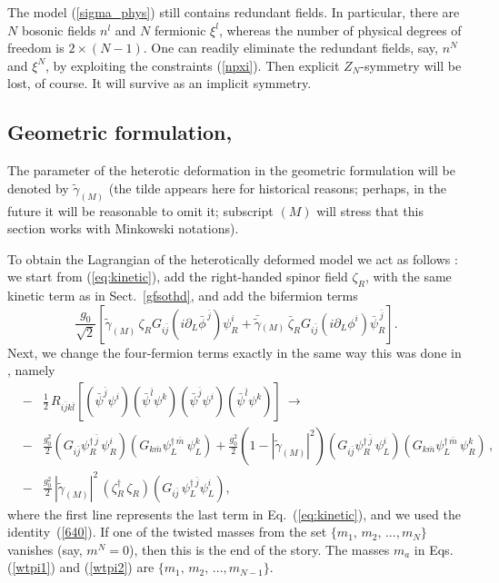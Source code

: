 \documentclass[epsfig,12pt]{article}
\def\beq{\begin{equation}}
\def\eeq{\end{equation}}
\def\beqn{\begin{eqnarray}}
\def\eeqn{\end{eqnarray}}
\newcommand{\pt}{\partial}
\newcommand{\zn}{$Z_N$}
\def\beqn{\begin{eqnarray}}
\def\eeqn{\end{eqnarray}}
\def\beq{\begin{equation}}
\def\eeq{\end{equation}}
\newcommand{\ssm}{{\scriptscriptstyle(M)}}
\begin{document}
	The model (\ref{sigma_phys}) still contains redundant fields.
	In particular, there are $N$ bosonic fields $n^l$ and $N$ fermionic $\xi^l$,
	whereas the number of physical degrees of 
	freedom is $2\times(N-1)$. 
	One can readily eliminate the redundant fields, say, $n^N$ and $\xi^N$,
	by exploiting the constraints (\ref{npxi}). Then explicit \zn-symmetry will be lost, of course.
	It will survive as an implicit symmetry.

\subsection{Geometric formulation, } 
\label{gftgnz}

The parameter of the heterotic deformation in the geometric formulation will be denoted by
$\tilde \gamma_\ssm$ (the tilde appears here for historical reasons;
perhaps, in the future it will be reasonable to omit it;
subscript $\scriptstyle (M)$ will stress that this section works with Minkowski notations).

To obtain the Lagrangian of the heterotically deformed model
we act as follows \cite{BSY3}: we start from (\ref{eq:kinetic}), add the
 right-handed spinor field $\zeta_R$, with the same kinetic term as in Sect.~\ref{gfsothd}, and
 add the bifermion terms
 \beq
 \frac{g_0}{\sqrt 2}
 \left[ \tilde{\gamma}_\ssm\, \zeta_RG_{i\bar j}\left(i\pt_L\bar\phi^{\,\bar j}\right)\psi_R^i + 
        \bar{\tilde \gamma}{}_\ssm\, \bar\zeta_R G_{i\bar j}\left(i\pt_L\phi^{i}
 \right)\bar\psi_R^{\,\bar j} 
 \right].
 \eeq
Next, we change the four-fermion terms exactly in the same way this was done in
 \cite{SY1},
 namely
 \beqn
&-&\frac{1}{2} \,R_{i\bar jk\bar l}\left[\left(\bar\psi^{\bar j}\psi^{i}\right)\left(\bar\psi^{\bar l}\psi^{k}\right)
\left(\bar\psi^{\bar j}\psi^{i}\right)\left(\bar\psi^{\bar l}\psi^{k}\right)
\right]
~\longrightarrow~
\nonumber\\[3mm]
&-& \frac{g_0^2}{2}\left( G_{i\bar j}\psi^{\dagger\, \bar j}_R\, \psi^{ i}_R\right)
\left( G_{k\bar m}\psi^{\dagger\, \bar m}_L\, \psi^{ k}_L\right)+
\frac{g_0^2}{2}\left(1-|\tilde\gamma_\ssm|^2\right)
\left( G_{i\bar j}\psi^{\dagger\, \bar j}_R\, \psi^{ i}_L\right)
\left( G_{k\bar m}\psi^{\dagger\, \bar m}_L\, \psi^{ k}_R\right)\,,
\nonumber
\\[4mm]
&-&
 \frac{g_0^2}{2} \, |\tilde{\gamma}_\ssm |^2 \,\left(\zeta_R^\dagger\, \zeta_R
\right)\left(G_{i\bar j}\,  \psi_L^{\dagger\,\bar j}\psi_L^i\right),
\eeqn
 where the first line represents the last term in Eq.~(\ref{eq:kinetic}), and we used the identity~(\ref{640}).
 If one of the twisted masses from the set  $\{m_1,\,m_2,\, ..., m_N\}$ vanishes (say, $m^N=0$),
then this is the end of the story. The masses 
$m_a$ in Eqs. (\ref{wtpi1}) and (\ref{wtpi2}) are $\{m_1,\,m_2,\, ..., m_{N-1}\}$.
\end{document}
